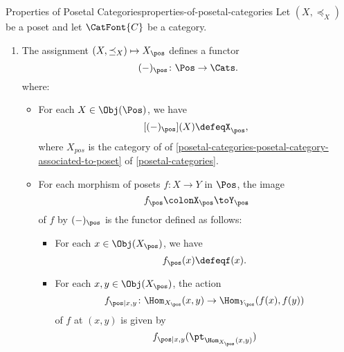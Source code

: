 \begin{proposition}{Properties of Posetal Categories}{properties-of-posetal-categories}%
    Let $(X,\preceq_{X})$ be a poset and let $\CatFont{C}$ be a category.
    \begin{enumerate}
        \item\label{properties-of-posetal-categories-functoriality}The assignment $(X,\preceq_{X})\mapsto X_{\pos}$ defines a functor
            \[
                (-)_{\pos}%
                \colon%
                \Pos%
                \to%
                \Cats.
            \]%
            where:
            \begin{itemize}
                \item{}For each $X\in\Obj(\Pos)$, we have
                    \[
                        [(-)_{\pos}](X)%
                        \defeq%
                        X_{\pos},
                    \]%
                    where $X_{pos}$ is the category of of \cref{posetal-categories-posetal-category-associated-to-poset} of \cref{posetal-categories}.
                \item{}For each morphism of posets $f\colon X\to Y$ in $\Pos$, the image
                    \[
                        f_{\pos}%
                        \colon%
                        X_{\pos}%
                        \to%
                        Y_{\pos}%
                    \]%
                    of $f$ by $(-)_{\pos}$ is the functor defined as follows:
                    \begin{itemize}
                        \item{}For each $x\in\Obj(X_{\pos})$, we have
                            \[
                                f_{\pos}(x)%
                                \defeq%
                                f(x).%
                            \]%
                        \item{}For each $x,y\in\Obj(X_{\pos})$, the action
                            \[
                                f_{\pos|x,y}%
                                \colon%
                                \Hom_{X_{\pos}}(x,y)%
                                \to%
                                \Hom_{Y_{\pos}}(f(x),f(y))%
                            \]%
                            of $f$ at $(x,y)$ is given by
                            \[
                                f_{\pos|x,y}(\pt_{\Hom_{X_{\pos}}(x,y)})%
\]
\end{itemize}
\end{itemize}
\end{enumerate}
\end{proposition}
